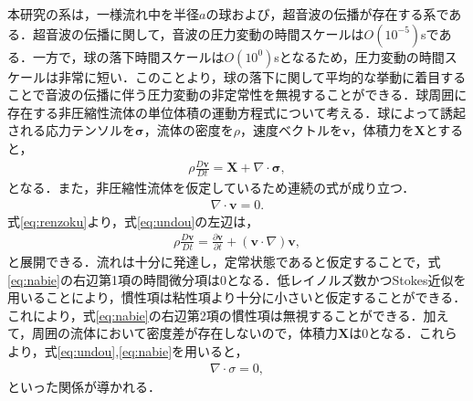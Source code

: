 本研究の系は，一様流れ中を半径$a$の球および，超音波の伝播が存在する系である．超音波の伝播に関して，音波の圧力変動の時間スケールは$O\left(10^{-5}\right)$sである．一方で，球の落下時間スケールは$O\left(10^{0}\right)$sとなるため，圧力変動の時間スケールは非常に短い．このことより，球の落下に関して平均的な挙動に着目することで音波の伝播に伴う圧力変動の非定常性を無視することができる．球周囲に存在する非圧縮性流体の単位体積の運動方程式について考える．球によって誘起される応力テンソルを$\bm{\sigma}$，流体の密度を$\rho$，速度ベクトルを$\bm{v}$，体積力を$\bm{X}$とすると，
\begin{eqnarray}
    \rho \frac{D\bm{v}}{Dt} = \bm{X} + \nabla \cdot \bm{\sigma} ,
    \label{eq:undou}
\end{eqnarray}
となる．また，非圧縮性流体を仮定しているため連続の式が成り立つ．
\begin{eqnarray}
    \nabla \cdot \bm{v} = 0 .
    \label{eq:renzoku}
\end{eqnarray}
式\ref{eq:renzoku}より，式\ref{eq:undou}の左辺は，
\begin{eqnarray}
    \rho \frac{D\bm{v}}{Dt} = \frac{\partial \bm{v}}{\partial t} + \left(\bm{v} \cdot \nabla \right) \bm{v} ,
    \label{eq:nabie}
\end{eqnarray}
と展開できる．流れは十分に発達し，定常状態であると仮定することで，式\ref{eq:nabie}の右辺第1項の時間微分項は0となる．低レイノルズ数かつStokes近似を用いることにより，慣性項は粘性項より十分に小さいと仮定することができる．これにより，式\ref{eq:nabie}の右辺第2項の慣性項は無視することができる．加えて，周囲の流体において密度差が存在しないので，体積力$\bm{X}$は0となる．これらより，式\ref{eq:undou},\ref{eq:nabie}を用いると，
\begin{eqnarray}
    \nabla \cdot \sigma = 0 ,
    \label{eq:sigma-}
\end{eqnarray}
といった関係が導かれる．

